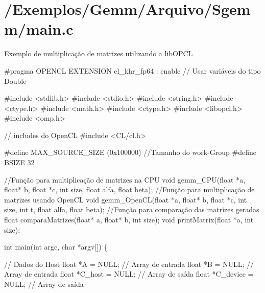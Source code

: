 \section{/\+Exemplos/\+Gemm/\+Arquivo/\+Sgemm/main.\+c}
Exemplo de multiplicação de matrizes utilizando a lib\+O\+P\+CL


\begin{DoxyCodeInclude}
\textcolor{preprocessor}{#pragma OPENCL EXTENSION cl\_khr\_fp64 : enable // Usar variáveis do tipo Double}

\textcolor{preprocessor}{#include <stdlib.h>}
\textcolor{preprocessor}{#include <stdio.h>}
\textcolor{preprocessor}{#include <string.h>}
\textcolor{preprocessor}{#include <ctype.h>}
\textcolor{preprocessor}{#include <math.h>}
\textcolor{preprocessor}{#include <ctype.h>}
\textcolor{preprocessor}{#include <libopcl.h>}
\textcolor{preprocessor}{#include <omp.h>}


\textcolor{comment}{// includes do OpenCL}
\textcolor{preprocessor}{#include <CL/cl.h>}

\textcolor{preprocessor}{#define MAX\_SOURCE\_SIZE (0x100000)}
\textcolor{comment}{//Tamanho do work-Group}
\textcolor{preprocessor}{#define BSIZE 32}

\textcolor{comment}{//Função para multiplicação de matrizes na CPU}
\textcolor{keywordtype}{void} gemm\_CPU(\textcolor{keywordtype}{float} *a, \textcolor{keywordtype}{float}* b, \textcolor{keywordtype}{float} *c, \textcolor{keywordtype}{int} size, \textcolor{keywordtype}{float} alfa, \textcolor{keywordtype}{float} beta);
\textcolor{comment}{//Função para multiplicação de matrizes usando OpenCL}
\textcolor{keywordtype}{void} gemm\_OpenCL(\textcolor{keywordtype}{float} *a, \textcolor{keywordtype}{float}* b, \textcolor{keywordtype}{float} *c, \textcolor{keywordtype}{int} size, \textcolor{keywordtype}{int} t, \textcolor{keywordtype}{float} alfa, \textcolor{keywordtype}{float} beta);
\textcolor{comment}{//Função para comparação das matrizes geradas}
\textcolor{keywordtype}{float} comparaMatrizes(\textcolor{keywordtype}{float}* a, \textcolor{keywordtype}{float}* b, \textcolor{keywordtype}{int} size);
\textcolor{keywordtype}{void} printMatrix(\textcolor{keywordtype}{float} *a, \textcolor{keywordtype}{int} size);

\textcolor{keywordtype}{int} main(\textcolor{keywordtype}{int} argc, \textcolor{keywordtype}{char} *argv[])
\{

    \textcolor{comment}{// Dados do Host}
    \textcolor{keywordtype}{float} *A = NULL;  \textcolor{comment}{// Array de entrada}
    \textcolor{keywordtype}{float} *B = NULL;  \textcolor{comment}{// Array de entrada}
    \textcolor{keywordtype}{float} *C\_host = NULL;  \textcolor{comment}{// Array de saída}
    \textcolor{keywordtype}{float} *C\_device = NULL;  \textcolor{comment}{// Array de saída}


\end{DoxyCodeInclude}
